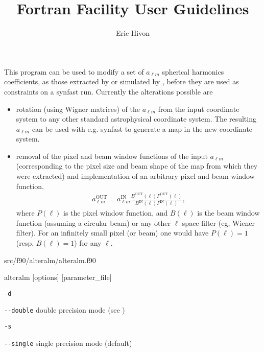 
\sloppy


\title{\healpix Fortran Facility User Guidelines}
 \section[alteralm]{\nosectionname}
\label{fac:alteralm}
\author{Eric Hivon}

\begin{facility}
{This program can be used to modify a set of $a_{\ell m}$ spherical harmonics
  coefficients, as those extracted by  or 
  simulated by , before
  they are used as constraints on a synfast run. Currently the alterations
  possible are %
\begin{itemize}
    \item rotation (using Wigner matrices) of the $a_{\ell m}$ from the input
    coordinate system to any other standard astrophysical coordinate system. The
    resulting $a_{\ell m}$ can be used with e.g. synfast to generate a map in the
    new coordinate system.
    \item removal of the pixel and beam window functions of the input
  $a_{\ell m}$ (corresponding to the pixel size and beam shape of the map from which
  they were extracted) and implementation of an arbitrary pixel and beam window
  function.
 \begin{eqnarray} 
 a_{\ell m}^\mathrm{OUT} = a_{\ell m}^\mathrm{IN} 
 \frac{B^\mathrm{OUT}(\ell) P^\mathrm{OUT}(\ell)}{B^\mathrm{IN}(\ell) 
 P^\mathrm{IN}(\ell)}, \label{eq:alteralm} 
 \end{eqnarray}
where $P(\ell)$ is the pixel window function, and $B(\ell)$ is the beam window
 function (assuming a circular beam) or any other $\ell$ space filter (eg,
 Wiener filter). For an infinitely small pixel (or beam) one would have $P(\ell) =
 1$ (resp. $B(\ell) = 1$) for any $\ell.$
\end{itemize}%
}%
{src/f90/alteralm/alteralm.f90}
\end{facility}

\begin{f90facility}
{alteralm [options] [parameter\_file]}
\end{f90facility}

\begin{options}
  \begin{optionlistwide}{} %
    \item[{\tt -d}]
    \item[{\tt -}{\tt -}{\tt double}] double precision mode (see 
)
    \item[{\tt -s}]
    \item[{\tt -}{\tt -}{\tt single}] single precision mode (default)
  \end{optionlistwide}
\end{options}

